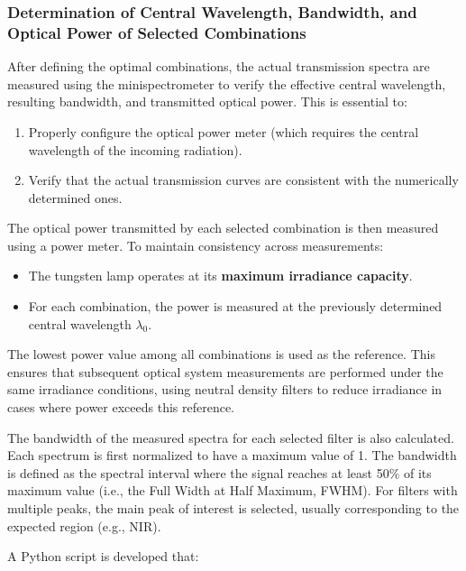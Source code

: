 \subsubsection{Determination of Central Wavelength, Bandwidth, and Optical Power of Selected Combinations}
\label{subsub:longitud_onda_central_potencia}

After defining the optimal combinations, the actual transmission spectra are measured using the minispectrometer to verify the effective central wavelength, resulting bandwidth, and transmitted optical power. This is essential to:

\begin{enumerate}
    \item Properly configure the optical power meter (which requires the central wavelength of the incoming radiation).
    \item Verify that the actual transmission curves are consistent with the numerically determined ones.
\end{enumerate}

The optical power transmitted by each selected combination is then measured using a power meter. To maintain consistency across measurements:

\begin{itemize}
    \item The tungsten lamp operates at its \textbf{maximum irradiance capacity}.
    \item For each combination, the power is measured at the previously determined central wavelength \(\lambda_0\).
\end{itemize}

The lowest power value among all combinations is used as the reference. This ensures that subsequent optical system measurements are performed under the same irradiance conditions, using neutral density filters to reduce irradiance in cases where power exceeds this reference.

\medskip

The bandwidth of the measured spectra for each selected filter is also calculated. Each spectrum is first normalized to have a maximum value of 1. The bandwidth is defined as the spectral interval where the signal reaches at least 50\% of its maximum value (i.e., the Full Width at Half Maximum, FWHM). For filters with multiple peaks, the main peak of interest is selected, usually corresponding to the expected region (e.g., NIR).

A Python script is developed that:

